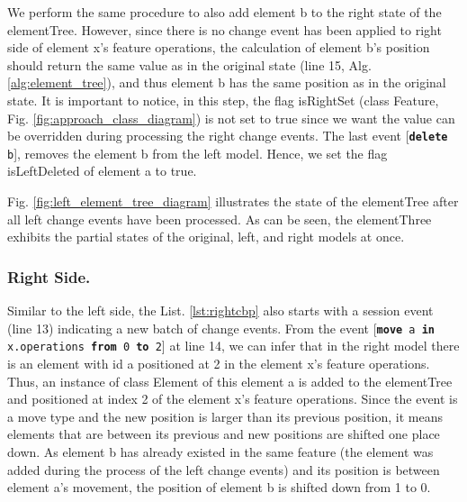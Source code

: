 \documentclass{llncs}
\begin{document}
We perform the same procedure to also add element \textsf{b} to the right state of the \textsf{elementTree}. However, since there is no change event has been applied to right side of element \textsf{x}'s feature \textsf{operations}, the calculation of element \textsf{b}'s position should return the same value as in the original state (line 15, Alg. \ref{alg:element_tree}), and thus element \textsf{b} has the same position as in the original state. It is important to notice, in this step, the flag \textsf{isRightSet} (class \textsf{Feature}, Fig. \ref{fig:approach_class_diagram}) is not set to \textsf{true} since we want the value can be overridden during processing the right change events. The last event [\texttt{\small \textbf{delete} b}], removes the element \textsf{b} from the left model. Hence, we set the flag \textsf{isLeftDeleted} of element \textsf{a} to \textsf{true}.

Fig. \ref{fig:left_element_tree_diagram} illustrates the state of the \textsf{elementTree} after all left change events have been processed. As can be seen, the \textsf{elementThree} exhibits the partial states of the original, left, and right models at once. 

\vspace{-10pt}
\subsubsection{Right Side.}\label{sec:right_side}  Similar to the left side, the List. \ref{lst:rightcbp} also starts with a \textsf{session} event (line 13) indicating a new batch of change events. From the event [\texttt{\small \textbf{move} a \textbf{in} x.operations \textbf{from} 0 \textbf{to} 2}] at line 14, we can infer that in the right model there is an element with id \textsf{a} positioned at 2 in the element \textsf{x}'s feature \textsf{operations}. Thus, an instance of class \textsf{Element} of this element \textsf{a} is added to the \textsf{elementTree} and positioned at index 2 of the element \textsf{x}'s feature \textsf{operations}. Since the event is a \textsf{move} type and the new position is larger than its previous position, it means elements that are between its previous and new positions are shifted one place down. As element \textsf{b} has already existed in the same feature (the element was added during the process of the left change events) and its position is between element \textsf{a}'s movement, the position of element \textsf{b} is shifted down from 1 to 0. 
\end{document}
